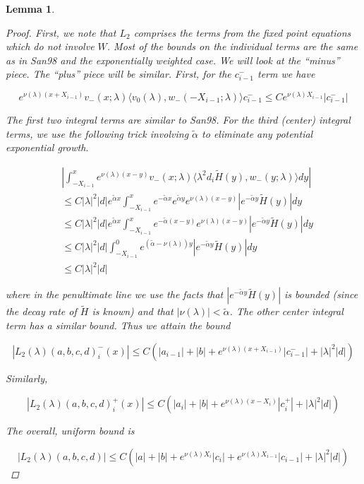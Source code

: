 \documentclass[12pt]{article}
\newtheorem{lemma}{Lemma}
\begin{document}
\begin{lemma}
\begin{proof}
First, we note that $L_2$ comprises the terms from the fixed point equations which do not involve $W$. Most of the bounds on the individual terms are the same as in San98 and the exponentially weighted case. We will look at the ``minus'' piece. The ``plus'' piece will be similar. First, for the $c_{i-1}^-$ term we have

\[
e^{\nu(\lambda)(x+X_{i-1})} v_-(x; \lambda) \langle v_0(\lambda), w_-(-X_{i-1}; \lambda) \rangle c_{i-1}^- \leq C e^{\nu(\lambda) X_{i-1} }|c_{i-1}^-|
\]

The first two integral terms are similar to San98. For the third (center) integral terms, we use the following trick involving $\tilde{\alpha}$ to eliminate any potential exponential growth.

\begin{align*}
&\left| \int_{-X_{i-1}}^x 
e^{\nu(\lambda)(x-y)} v_-(x; \lambda) \langle \lambda^2 d_i \tilde{H}(y), w_-(y; \lambda) \rangle dy \right| \\
&\leq C |\lambda|^2 |d| e^{\tilde{\alpha}x} \int_{-X_{i-1}}^x e^{-\tilde{\alpha}x} e^{\tilde{\alpha}y} e^{\nu(\lambda)(x-y)} |e^{-\tilde{\alpha}y}\tilde{H}(y)|dy \\
&\leq C |\lambda|^2 |d| e^{\tilde{\alpha}x} \int_{-X_{i-1}}^x e^{-\tilde{\alpha}(x-y)} e^{\nu(\lambda)(x-y)} |e^{-\tilde{\alpha}y}\tilde{H}(y)|dy \\
&\leq C |\lambda|^2 |d| \int_{-X_{i-1}}^0 e^{(\tilde{\alpha}-\nu(\lambda))y} |e^{-\tilde{\alpha}y}\tilde{H}(y)|dy \\
&\leq C |\lambda|^2 |d|
\end{align*}

where in the penultimate line we use the facts that $|e^{-\tilde{\alpha}y}\tilde{H}(y)|$ is bounded (since the decay rate of $\tilde{H}$ is known) and that $|\nu(\lambda)| < \tilde{\alpha}$. The other center integral term has a similar bound. Thus we attain the bound 

\[
|L_2(\lambda)(a,b,c,d)_i^-(x)| \leq C (|a_{i-1}| + |b| + e^{\nu(\lambda)(x + X_{i-1})}|c_{i-1}^-| + |\lambda|^2 |d| )
\]

Similarly,

\[
|L_2(\lambda)(a,b,c,d)_i^+(x)| \leq C (|a_i| + |b| + e^{\nu(\lambda)(x - X_i)}|c_i^+| + |\lambda|^2 |d| )
\]

The overall, uniform bound is

\[
|L_2(\lambda)(a,b,c,d)| \leq C (|a| + |b| + e^{\nu(\lambda)X_i}|c_i| + e^{\nu(\lambda)X_{i-1}}|c_{i-1}| + |\lambda|^2 |d| )
\]

\end{proof}
\end{lemma}
\end{document}
